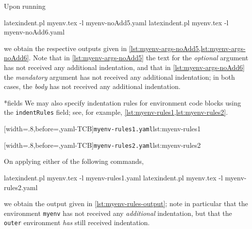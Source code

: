 Upon running
\begin{commandshell}
latexindent.pl myenv.tex -l myenv-noAdd5.yaml  
latexindent.pl myenv.tex -l myenv-noAdd6.yaml  
\end{commandshell}
we obtain the respective outputs given in \cref{lst:myenv-args-noAdd5,lst:myenv-args-noAdd6}. Note that in \cref{lst:myenv-args-noAdd5} 
the text for the \emph{optional} argument has not received any additional indentation, and that in \cref{lst:myenv-args-noAdd6} the 
\emph{mandatory} argument has not received any additional indentation; in both cases, the \emph{body} has not received any additional indentation.

\begin{minipage}{.45\textwidth}
\end{minipage}
\hfill
\begin{minipage}{.45\textwidth}
\end{minipage}

*{fields} 
We may also specify indentation rules for environment code blocks using the \texttt{indentRules} field; see, for example,
\cref{lst:myenv-rules1,lst:myenv-rules2}.

\begin{minipage}{.45\textwidth}
[width=.8\linewidth,before=\centering,yaml-TCB]{\texttt{myenv-rules1.yaml}}{lst:myenv-rules1}
\end{minipage}
\hfill
\begin{minipage}{.45\textwidth}
[width=.8\linewidth,before=\centering,yaml-TCB]{\texttt{myenv-rules2.yaml}}{lst:myenv-rules2}
\end{minipage}

On applying either of the following commands,
\begin{commandshell}
latexindent.pl myenv.tex -l myenv-rules1.yaml  
latexindent.pl myenv.tex -l myenv-rules2.yaml  
\end{commandshell}
we obtain the output given in \cref{lst:myenv-rules-output}; note in particular that the environment \texttt{myenv} 
has not received any \emph{additional} indentation, but that the \texttt{outer} environment \emph{has} still 
received indentation.

